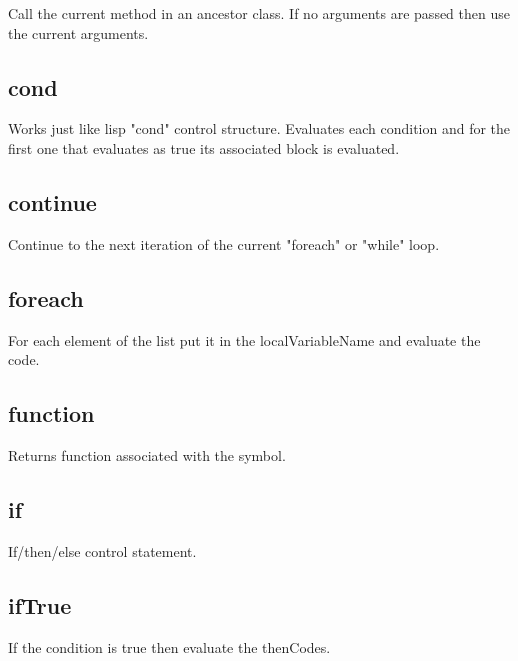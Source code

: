 \begin{itemize}
  Call the current method in an ancestor class.
  If no arguments are passed then use the current arguments.

\subsection{cond}
  \par

  Works just like lisp "cond" control structure. Evaluates each condition and for the first one that evaluates as true its associated block is evaluated.

\subsection{continue}

  Continue to the next iteration of the current "foreach" or "while" loop.

\subsection{foreach}

  For each element of the list put it in the localVariableName and evaluate the code.

\subsection{function}

  Returns function associated with the symbol.

\subsection{if}
  \par

  If/then/else control statement.

\subsection{ifTrue}
  \par

  If the condition is true then evaluate the thenCodes.


\end{itemize}
